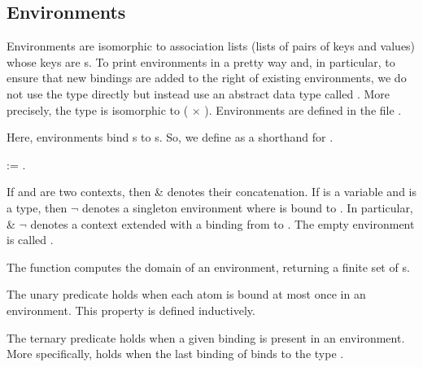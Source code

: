 \documentclass[12pt]{report}
\begin{document}
\subsection{Environments}



 Environments are isomorphic to association lists (lists of pairs of
    keys and values) whose keys are s.  To print environments in a
    pretty way and, in particular, to ensure that new bindings are added
    to the right of existing environments, we do not use the type 
    directly but instead use an abstract data type called . More
    precisely, the type   is isomorphic to  ( \ensuremath{\times} ).
    Environments are defined in the file . 


    Here, environments bind s to s. So, we define  as a
    shorthand for  . 
\begin{coqdoccode}
\coqdocemptyline
\coqdocnoindent
{}  :=  .\coqdoceol
\coqdocemptyline
\end{coqdoccode}
If  and  are two contexts, then  \&  denotes their 
    concatenation. If  is a variable and  is a type, then 
     \ensuremath{\lnot}  denotes a singleton environment where  is bound to .
    In particular,  \&  \ensuremath{\lnot}  denotes a context  extended 
    with a binding from  to . The empty environment is 
    called .


 The function  computes the domain of an environment,
    returning a finite set of s. \begin{coqdoccode}
\coqdocemptyline
\end{coqdoccode}
The unary predicate  holds when each atom is bound at most
    once in an environment. This property is defined inductively. \begin{coqdoccode}
\coqdocemptyline
\coqdocemptyline
\end{coqdoccode}
The ternary predicate  holds when a given binding is
    present in an environment.  More specifically,     holds
    when the last binding of  binds  to the type . \begin{coqdoccode}
\coqdocemptyline
\coqdocemptyline
\end{coqdoccode}
\end{document}
